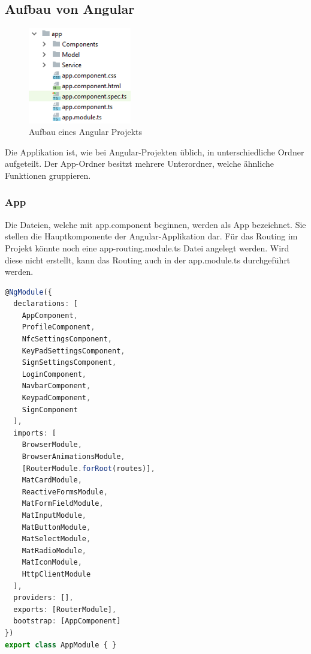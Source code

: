 \subsection{Aufbau von Angular}

\begin{figure}[h]
    \centering
    \includegraphics[width=0.4\textwidth]{pics/Aufbau_Angular.png}
    \caption{Aufbau eines Angular Projekts}
    \end{figure}

Die Applikation ist, wie bei Angular-Projekten üblich, in unterschiedliche Ordner aufgeteilt. Der App-Ordner besitzt mehrere Unterordner, welche ähnliche Funktionen gruppieren.

\subsubsection{App}
Die Dateien, welche mit app.component beginnen, werden als App bezeichnet. Sie stellen die Hauptkomponente der Angular-Applikation dar. Für das Routing im Projekt könnte noch eine app-routing.module.ts Datei angelegt werden. Wird diese nicht erstellt, kann das Routing auch in der app.module.ts durchgeführt werden.

\begin{lstlisting}[language=typescript, caption=app.module.ts]
    @NgModule({
  declarations: [
    AppComponent,
    ProfileComponent,
    NfcSettingsComponent,
    KeyPadSettingsComponent,
    SignSettingsComponent,
    LoginComponent,
    NavbarComponent,
    KeypadComponent,
    SignComponent
  ],
  imports: [
    BrowserModule,
    BrowserAnimationsModule,
    [RouterModule.forRoot(routes)],
    MatCardModule,
    ReactiveFormsModule,
    MatFormFieldModule,
    MatInputModule,
    MatButtonModule,
    MatSelectModule,
    MatRadioModule,
    MatIconModule,
    HttpClientModule
  ],
  providers: [],
  exports: [RouterModule],
  bootstrap: [AppComponent]
})
export class AppModule { }
\end{lstlisting}

